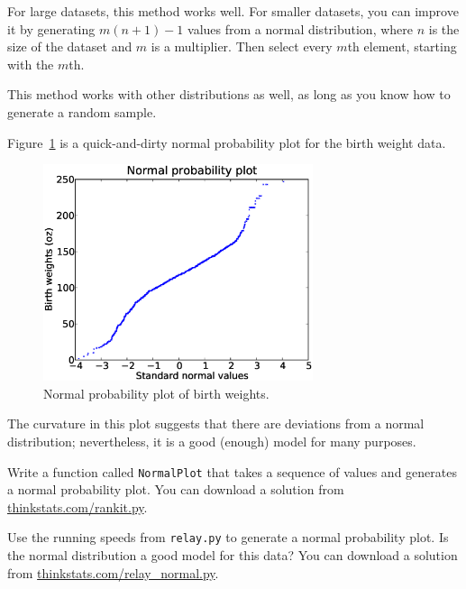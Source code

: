 \documentclass[12pt]{book}
\begin{document}
For large datasets, this method works well.
For smaller datasets, you can improve it by generating $m (n+1) - 1$
values from a normal distribution, where $n$ is the size of the
dataset and $m$ is a multiplier.  Then select every $m$th element,
starting with the $m$th.  


This method works with other distributions as well, as long as
you know how to generate a random sample.

Figure~\ref{nsfg_birthwgt_normal} is a quick-and-dirty normal
probability plot for the birth weight data.


\begin{figure}
\centerline{\includegraphics[height=2.5in]{figs/nsfg_birthwgt_normal.eps}}
\caption{Normal probability plot of birth weights.}
\label{nsfg_birthwgt_normal}
\end{figure}

The curvature in this plot suggests that there are
deviations from a normal distribution; nevertheless, it is a
good (enough) model for many purposes.


\begin{exercise}
Write a function called {\tt NormalPlot} that takes a sequence of
values and generates a normal probability plot.  You can download
a solution from \url{thinkstats.com/rankit.py}.




Use the running speeds from {\tt relay.py} to generate a normal
probability plot.  Is the normal distribution a good model for this
data?  You can download a solution from
\url{thinkstats.com/relay_normal.py}.

\end{exercise}
\end{document}
